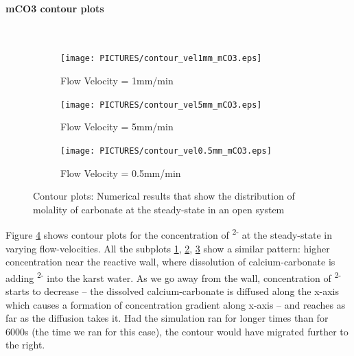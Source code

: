 \paragraph*{mCO3 contour plots} \mbox{}\\

\begin{figure}[!h]
\centering
    \begin{subfigure}{.5\linewidth}
        \centering
        \texttt{[image: PICTURES/contour\_vel1mm\_mCO3.eps]}
        \caption{Flow Velocity = 1mm/min}
        \label{fig:CO3Steady-state}       %
    \end{subfigure}%
    \hfill
    \begin{subfigure}{.5\linewidth}
        \centering
        \texttt{[image: PICTURES/contour\_vel5mm\_mCO3.eps]}
        \caption{Flow Velocity = 5mm/min}
        \label{fig:CO3Steady-state5mm}       %
    \end{subfigure}%
    \hfill
    \begin{subfigure}{.5\linewidth}
        \centering
        \texttt{[image: PICTURES/contour\_vel0.5mm\_mCO3.eps]}
        \caption{Flow Velocity = 0.5mm/min}
        \label{fig:CO3Steady-state0.5mm}       %
    \end{subfigure}%
    \caption{\DuMuX Contour plots: Numerical results that show the distribution of molality of carbonate at the steady-state in an open system}
     \label{fig:contourCO3}
\end{figure}


Figure \ref{fig:contourCO3} shows contour plots for the concentration of \textsuperscript{2-} at the steady-state in varying 
flow-velocities. All the subplots \ref{fig:CO3Steady-state}, \ref{fig:CO3Steady-state5mm}, \ref{fig:CO3Steady-state0.5mm} show a similar 
pattern: higher concentration near the reactive wall, where dissolution of calcium-carbonate is adding \textsuperscript{2-} into 
the karst water. As we go away from the wall, concentration of \textsuperscript{2-} starts to decrease -- the dissolved calcium-carbonate 
is diffused along the x-axis which causes a formation of concentration gradient along x-axis -- and reaches as far as the diffusion takes it. 
Had the simulation ran for longer times than for 6000s (the time we ran for this case), the contour would have migrated further to the right. 

